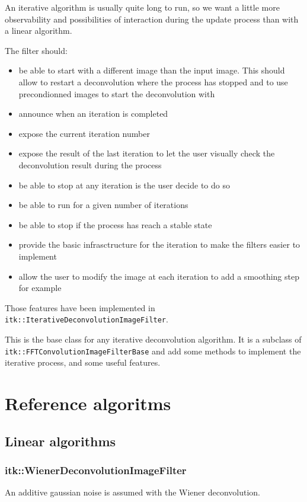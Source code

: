 \documentclass{InsightArticle}
\begin{document}
An iterative algorithm is usually quite long to run, so we want a little more observability and possibilities of interaction during the update
process than with a linear algorithm. 

The filter should:
\begin{itemize}
 \item be able to start with a different image than the input image. This should allow to restart a deconvolution where the process has stopped
       and to use precondionned images to start the deconvolution with
 \item announce when an iteration is completed
 \item expose the current iteration number
 \item expose the result of the last iteration to let the user visually check the deconvolution result during the process
 \item be able to stop at any iteration is the user decide to do so
 \item be able to run for a given number of iterations
 \item be able to stop if the process has reach a stable state
 \item provide the basic infrasctructure for the iteration to make the filters easier to implement
 \item allow the user to modify the image at each iteration to add a smoothing step for example
\end{itemize}
Those features have been implemented in \verb$itk::IterativeDeconvolutionImageFilter$.

This is the base class for any iterative deconvolution algorithm. It is a subclass of \verb$itk::FFTConvolutionImageFilterBase$ and add some methods
to implement the iterative process, and some useful features.

\section{Reference algoritms}

\subsection{Linear algorithms}
\subsubsection{itk::WienerDeconvolutionImageFilter}

An additive gaussian noise is assumed with the Wiener deconvolution. 
\end{document}
